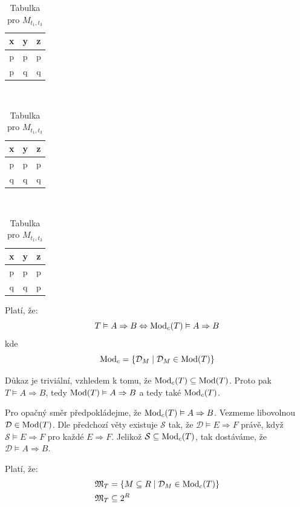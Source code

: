 \begin{table}
\caption{Výsledek příkladu \ref{ex:fun2}}\label{tab:existres}
\begin{subtable}[t]{0.3\textwidth}
\centering
\caption{Tabulka pro $M_{t_{1}, t_{2}}$}
\begin{tabular}{c c c}
x & y & z \\
\hline
p & p & p \\
p & q & q
\end{tabular}
\end{subtable}
~
\begin{subtable}[t]{0.3\textwidth}
\centering
\caption{Tabulka pro $M_{t_{2}, t_{3}}$}
\begin{tabular}{c c c}
x & y & z \\
\hline
p & p & p \\
q & q & q
\end{tabular}
\end{subtable}
~
\begin{subtable}[t]{0.3\textwidth}
\centering
\caption{Tabulka pro $M_{t_{1}, t_{3}}$}
\begin{tabular}{c c c}
x & y & z \\
\hline
p & p & p \\
q & q & p
\end{tabular}
\end{subtable}
\end{table}
\begin{upquote}
Platí, že:
$$
T \vDash A \Rightarrow B \Leftrightarrow \operatorname{Mod} _{c}(T) \vDash A \Rightarrow B$$ kde $$ \operatorname{Mod} _{c} = \left\{ \mathcal{D}_{M} \; | \; \mathcal{D}_{M} \in \operatorname{Mod}(T) \right\}
$$
\end{upquote}
\begin{upproof}
Důkaz je triviální, vzhledem k tomu, že $\operatorname{Mod}_{c}(T) \subseteq \operatorname{Mod}(T)$. Proto pak $T \vDash A \Rightarrow B$, tedy $\operatorname{Mod}(T) \vDash A \Rightarrow B$ a tedy také $\operatorname{Mod}_{c}(T)$.

Pro opačný směr předpokládejme, že $\operatorname{Mod}_{c}(T) \vDash A \Rightarrow B$. Vezmeme libovolnou $\mathcal{D} \in \operatorname{Mod}(T)$. Dle předchozí věty existuje $\mathcal{S}$ tak, že $\mathcal{D} \vDash E \Rightarrow F$ právě, když $\mathcal{S} \vDash E \Rightarrow F$ pro každé $E \Rightarrow F$. Jelikož $\mathcal{S} \subseteq \operatorname{Mod}_{c}(T)$, tak dostáváme, že $\mathcal{D} \vDash A \Rightarrow B$.
\end{upproof}

\begin{uptheorem}\label{def:uza}
Platí, že:
\begin{align*}
\mathfrak{M}_{T} &= \left\{ M \subseteq R \; | \; \mathcal{D}_{M} \in \operatorname{Mod}_{c}(T) \right\} \\
\mathfrak{M}_{T} &\subseteq 2^{R}
\end{align*}
\end{uptheorem}

